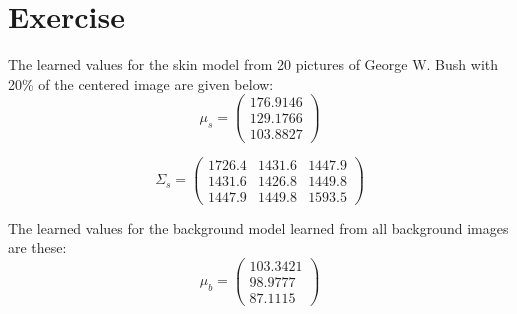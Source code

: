 \documentclass[conference]{IEEEtran}
\begin{document}
\newpage
\section{Exercise}

\begin{compactenum}[a)]
\item The learned values for the skin model from 20 pictures of George W. Bush with 20\% of the centered image are given below:
$$
\mu_s =
 \begin{pmatrix}
  176.9146 \\
  129.1766 \\
  103.8827
 \end{pmatrix}
$$

$$
\Sigma_s =
 \begin{pmatrix}
    1726.4  &  1431.6  &  1447.9 \\
    1431.6  &  1426.8  &  1449.8 \\
    1447.9  &  1449.8  &  1593.5
 \end{pmatrix}
$$

\item The learned values for the background model learned from all background images are these:
$$
\mu_b =
 \begin{pmatrix}
  103.3421 \\
   98.9777 \\
   87.1115
 \end{pmatrix}
$$


\end{compactenum}
\end{document}
